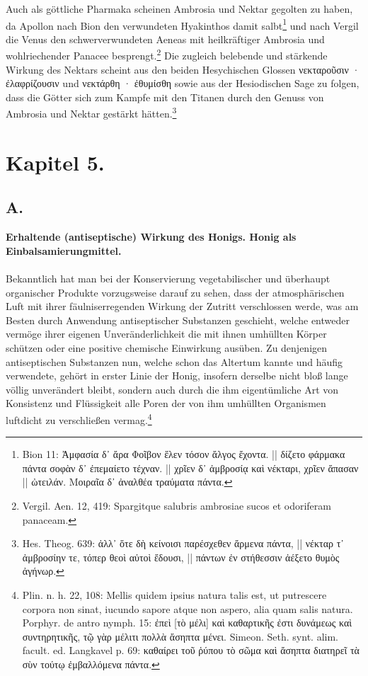 \documentclass[a4paper, 11pt, oneside]{article}
\begin{document}
Auch als göttliche Pharmaka scheinen Ambrosia und Nektar gegolten zu haben, da Apollon nach Bion den verwundeten Hyakinthos damit salbt\footnote{Bion 11: Ἀμφασία δ᾽ ἄρα Φοῖβον ἕλεν τόσον ἄλγος ἔχοντα. || δίζετο φάρμακα πάντα σοφὰν δ᾽ ἐπεμαίετο τέχναν. || χρῖεν δ᾽ ἀμβροσίᾳ καὶ νέκταρι, χρῖεν ἅπασαν || ὠτειλάν. Μοιραῖα δ᾽ ἀναλθέα τραύματα πάντα.} und nach Vergil die Venus den schwerverwundeten Aeneas mit heilkräftiger Ambrosia und wohlriechender Panacee besprengt.\footnote{Vergil. Aen. 12, 419: Spargitque salubris ambrosiae sucos et odoriferam panaceam.} Die zugleich belebende und stärkende Wirkung des Nektars scheint aus den beiden Hesychischen Glossen νεκταροῦσιν · ἐλαφρίζουσιν und νεκτάρθη · ἐθυμίσθη sowie aus der Hesiodischen Sage zu folgen, dass die Götter sich zum Kampfe mit den Titanen durch den Genuss von Ambrosia und Nektar gestärkt hätten.\footnote{Hes. Theog. 639: ἀλλ᾽ ὅτε δὴ κείνοισι παρέσχεθεν ἄρμενα πάντα, || νέκταρ τ᾽ ἀμβροσίην τε, τόπερ θεοὶ αὐτοὶ ἔδουσι, || πάντων ἐν στήθεσσιν ἀέξετο θυμὸς ἀγήνωρ.}
\clearpage
\section{Kapitel 5.}
\subsection{A.}
\begin{center}
\textbf{Erhaltende (antiseptische) Wirkung des Honigs. Honig als Einbalsamierungmittel.}
\end{center}
\paragraph{}
Bekanntlich hat man bei der Konservierung vegetabilischer und überhaupt organischer Produkte vorzugsweise darauf zu sehen, dass der atmosphärischen Luft mit ihrer fäulniserregenden Wirkung der Zutritt verschlossen werde, was am Besten durch Anwendung antiseptischer Substanzen geschieht, welche entweder vermöge ihrer eigenen Unveränderlichkeit die mit ihnen umhüllten Körper schützen oder eine positive chemische Einwirkung ausüben. Zu denjenigen antiseptischen Substanzen nun, welche schon das Altertum kannte und häufig verwendete, gehört in erster Linie der Honig, insofern derselbe nicht bloß lange völlig unverändert bleibt, sondern auch durch die ihm eigentümliche Art von Konsistenz und Flüssigkeit alle Poren der von ihm umhüllten Organismen luftdicht zu verschließen vermag.\footnote{Plin. n. h. 22, 108: Mellis quidem ipsius natura talis est, ut putrescere corpora non sinat, iucundo sapore atque non aspero, alia quam salis natura. Porphyr. de antro nymph. 15: ἐπεὶ [τὸ μέλι] καὶ καθαρτικῆς ἐστι δυνάμεως καὶ συντηρητικῆς, τῷ γὰρ μέλιτι πολλὰ ἄσηπτα μένει. Simeon. Seth. synt. alim. facult. ed. Langkavel p. 69: καθαίρει τοῦ ῥύπου τὸ σῶμα καὶ ἄσηπτα διατηρεῖ τὰ σὺν τούτῳ ἐμβαλλόμενα πάντα.}
\end{document}
